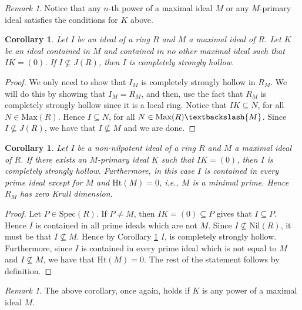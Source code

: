 \documentclass[11pt,english]{amsart}
\newtheorem{corollary}[theorem]{Corollary}
\theoremstyle{definition}
\numberwithin{equation}{section}
\theoremstyle{remark}
\newtheorem{remark}[theorem]{Remark}
\begin{document}
\begin{remark}
Notice that any $n$-th power of a maximal ideal $M$ or any $M$-primary ideal satisfies the conditions for $K$ above.	
\end{remark}

\begin{corollary}\label{s_ann_condition}
 Let $I$ be an ideal of a ring $R$ and $M$ a maximal ideal of $R$. Let $K$ be an ideal contained in $M$ and contained in no other maximal ideal such that $IK=(0)$. If $I\not\subseteq J(R)$, then $I$ is completely strongly hollow.
\end{corollary}

\begin{proof}
We only need to show that $I_M$ is completely strongly hollow in $R_M$. We will do this by showing that $I_M=R_M$, and then, use the fact that $R_M$ is completely strongly hollow since it is a local ring. Notice that $IK\subseteq N$, for all $N\in\mathrm{Max}(R)$. Hence $I\subseteq N$, for all $N\in\mathrm{Max}(R)\textbackslash\{M\}$. Since $I\not\subseteq J(R)$, we have that $I\not\subseteq M$ and we are done. 
\end{proof}

\begin{corollary}\label{strongest_ann}
    Let $I$ be a non-nilpotent ideal of a ring $R$ and $M$ a maximal ideal of $R$. If there exists an $M$-primary ideal $K$ such that $IK=(0)$, then $I$ is completely strongly hollow. Furthermore, in this case $I$ is contained in every prime ideal except for $M$ and $\mathrm{Ht}(M)=0$, i.e., $M$ is a minimal prime. Hence $R_M$ has zero Krull dimension.
\end{corollary}

\begin{proof}
    Let $P\in \mathrm{Spec}(R)$. If $P\neq M$, then $IK=(0)\subseteq P$ gives that $I\subseteq P$. Hence $I$ is contained in all prime ideals which are not $M$. Since $I\not\subseteq \mathrm{Nil}(R)$, it must be that $I\not\subseteq M$. Hence by Corollary \ref{s_ann_condition} $I$, is completely strongly hollow. Furthermore, since $I$ is contained in every prime ideal which is not equal to $M$ and $I\not\subseteq M$, we have that $\mathrm{Ht}(M)=0$. The rest of the statement follows by definition.
\end{proof}

\begin{remark}
The above corollary, once again, holds if $K$ is any power of a maximal ideal $M$. 
\end{remark}
\end{document}
